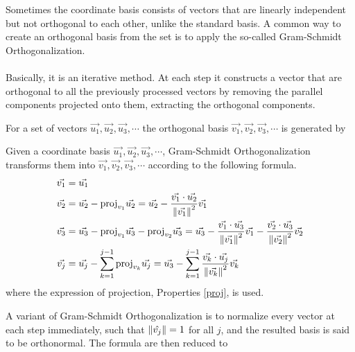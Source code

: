 Sometimes the coordinate basis consists of vectors that are linearly independent but not orthogonal to each other, unlike the standard basis. A common way to create an orthogonal basis from the set is to apply the so-called Gram-Schmidt Orthogonalization.\\
\\
Basically, it is an iterative method. At each step it constructs a vector that are orthogonal to all the previously processed vectors by removing the parallel components projected onto them, extracting the orthogonal components.
\begin{center}
\end{center}
For a set of vectors $\vec{u_1}, \vec{u_2}, \vec{u_3}, \cdots$ the orthogonal basis $\vec{v_1}, \vec{v_2}, \vec{v_3}, \cdots$ is generated by
\begin{defn}
Given a coordinate basis $\vec{u_1}, \vec{u_2}, \vec{u_3}, \cdots$, Gram-Schmidt Orthogonalization transforms them into $\vec{v_1}, \vec{v_2}, \vec{v_3}, \cdots$ according to the following formula.
\begin{align*}
\vec{v_1} &= \vec{u_1} \\
\vec{v_2} &= \vec{u_2} - \text{proj}_{v_1}\vec{u_2} = \vec{u_2} - \frac{\vec{v_1} \cdot \vec{u_2}}{\norm{\vec{v_1}}^2} \vec{v_1}\\
\vec{v_3} &= \vec{u_3} - \text{proj}_{v_1}\vec{u_3} - \text{proj}_{v_2}\vec{u_3} = \vec{u_3} - \frac{\vec{v_1} \cdot \vec{u_3}}{\norm{\vec{v_1}}^2} \vec{v_1} - \frac{\vec{v_2} \cdot \vec{u_3}}{\norm{\vec{v_2}}^2} \vec{v_2}\\
\vec{v_j} &= \vec{u_j} - \sum_{k=1}^{j-1}\text{proj}_{v_k}\vec{u_j}  = \vec{u_3} - \sum_{k=1}^{j-1}\frac{\vec{v_k} \cdot \vec{u_j}}{\norm{\vec{v_k}}^2} \vec{v_k}
\end{align*}
where the expression of projection, Properties \ref{proj}, is used.
\end{defn}
A variant of Gram-Schmidt Orthogonalization is to normalize every vector at each step immediately, such that $\norm{\hat{v_j}} = 1$ for all $j$, and the resulted basis is said to be orthonormal. The formula are then reduced to
